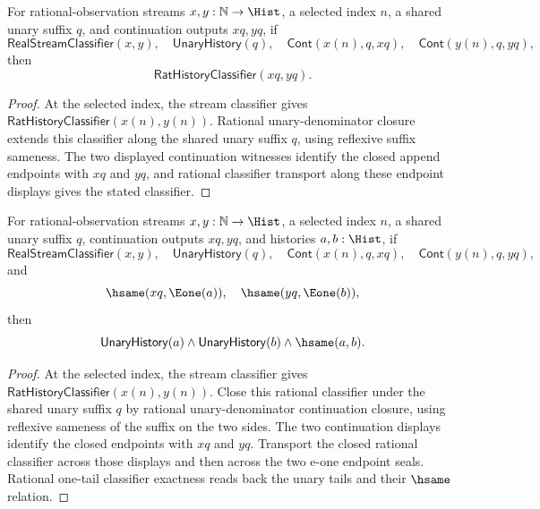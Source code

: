 \begin{theorem}
\label{thm:real-stream-classifier-selected-continuation-rat-classifier}
For rational-observation streams $x,y:\mathbb{N}\to\Hist$, a selected index
$n$, a shared unary suffix $q$, and continuation outputs $xq,yq$, if
$$
\mathsf{RealStreamClassifier}(x,y),\quad
\mathsf{UnaryHistory}(q),\quad
\mathsf{Cont}(x(n),q,xq),\quad
\mathsf{Cont}(y(n),q,yq),
$$
then
$$
\mathsf{RatHistoryClassifier}(xq,yq).
$$
\end{theorem}
\begin{proof}
At the selected index, the stream classifier gives
$\mathsf{RatHistoryClassifier}(x(n),y(n))$. Rational unary-denominator closure
extends this classifier along the shared unary suffix $q$, using reflexive
suffix sameness. The two displayed continuation witnesses identify the closed
append endpoints with $xq$ and $yq$, and rational classifier transport along
these endpoint displays gives the stated classifier.
\end{proof}

\begin{theorem}
\label{thm:real-stream-classifier-selected-continuation-e1-pair-readback}
For rational-observation streams $x,y:\mathbb{N}\to\Hist$, a selected index
$n$, a shared unary suffix $q$, continuation outputs $xq,yq$, and histories
$a,b:\Hist$, if
$$
\mathsf{RealStreamClassifier}(x,y),\quad
\mathsf{UnaryHistory}(q),\quad
\mathsf{Cont}(x(n),q,xq),\quad
\mathsf{Cont}(y(n),q,yq),
$$
and
$$
\hsame(xq,\Eone(a)),\quad \hsame(yq,\Eone(b)),
$$
then
$$
\mathsf{UnaryHistory}(a)\land \mathsf{UnaryHistory}(b)\land \hsame(a,b).
$$
\end{theorem}
\begin{proof}
At the selected index, the stream classifier gives
$\mathsf{RatHistoryClassifier}(x(n),y(n))$. Close this rational classifier
under the shared unary suffix $q$ by rational unary-denominator continuation
closure, using reflexive sameness of the suffix on the two sides. The two
continuation displays identify the closed endpoints with $xq$ and $yq$.
Transport the closed rational classifier across those displays and then across
the two e-one endpoint seals. Rational one-tail classifier exactness reads back
the unary tails and their $\hsame$ relation.
\end{proof}

